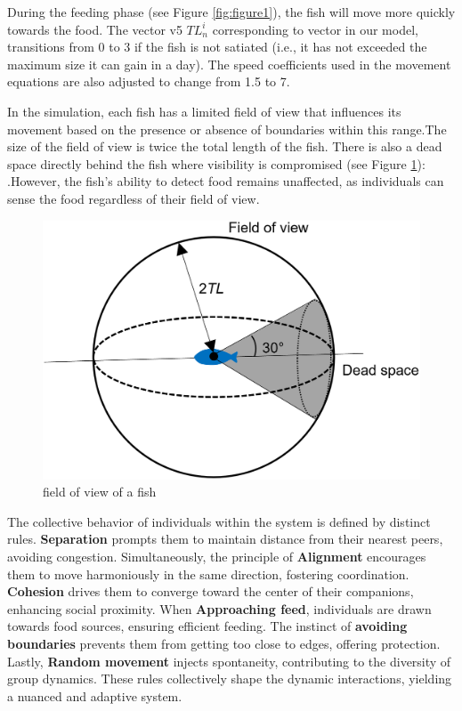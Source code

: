 \documentclass[9pt]{pnas-new}
\begin{document}
During the feeding phase (see Figure \ref{fig:figure1}), the fish will move more quickly towards the food. The vector v5 \(TL_n^i\) corresponding to vector in our model, transitions from 0 to 3 if the fish is not satiated (i.e., it has not exceeded the maximum size it can gain in a day). The speed coefficients used in the movement equations are also adjusted to change from 1.5 to 7. 

In the simulation, each fish has a limited field of view that influences its movement based on the presence or absence of boundaries within this range.The size of the field of view is twice the total length of the fish. There is also a dead space directly behind the fish where visibility is compromised  (see Figure \ref{fig:Field of view}): .However, the fish's ability to detect food remains unaffected, as individuals can sense the food regardless of their field of view. 


\begin{figure}[h]
    \centering
    \begin{minipage}[b]{0.5\linewidth}
        \includegraphics[width=\textwidth]{fig/field_of_view.PNG}
        \caption{field of view of a fish}
        \label{fig:Field of view}
    \end{minipage}
\end{figure}


The collective behavior of individuals within the system is defined by distinct rules. \textbf{Separation} prompts them to maintain distance from their nearest peers, avoiding congestion. Simultaneously, the principle of \textbf{Alignment} encourages them to move harmoniously in the same direction, fostering coordination. \textbf{Cohesion} drives them to converge toward the center of their companions, enhancing social proximity. When \textbf{Approaching feed}, individuals are drawn towards food sources, ensuring efficient feeding. The instinct of \textbf{avoiding boundaries} prevents them from getting too close to edges, offering protection. Lastly, \textbf{Random movement} injects spontaneity, contributing to the diversity of group dynamics. These rules collectively shape the dynamic interactions, yielding a nuanced and adaptive system.
\end{document}
